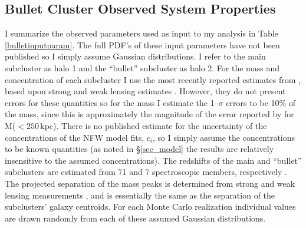 \subsection{Bullet Cluster Observed System Properties}\label{sec_bc_obsprop}

I summarize the observed  parameters used as input to my analysis in Table \ref{bulletinputparam}.  
The full PDF's of these input parameters have not been published so I simply assume Gaussian distributions.
I refer to the main subcluster as halo 1 and the ``bullet'' subcluster as halo 2.  
For the mass and concentration of each subcluster I use the most recently reported estimates from \citet{Springel:2007bg}, based upon strong and weak lensing estimates \citep{Bradac:2006be}.
However, they do not present errors for these quantities so for the mass I estimate the  1--$\sigma$ errors to be 10\% of the mass, since this is approximately the magnitude of the error reported by \citet{Bradac:2006be} for M($<250$\,kpc).
There is no published estimate for the uncertainty of the concentrations of the NFW model fits, $c_i$, so I simply assume the concentrations to be known quantities (as noted in \S\ref{sec_model} the results are relatively insensitive to the assumed concentrations). 
The redshifts of the main and ``bullet'' subclusters are estimated from 71 and 7 spectroscopic members, respectively \citep{Barrena:2002dj}.
The projected separation of the mass peaks is determined from strong and weak lensing measurements \citep{Bradac:2006be}, and is essentially the same as the separation of the subclusters' galaxy centroids.
For each Monte Carlo realization individual values are drawn randomly from each of these assumed Gaussian distributions.

